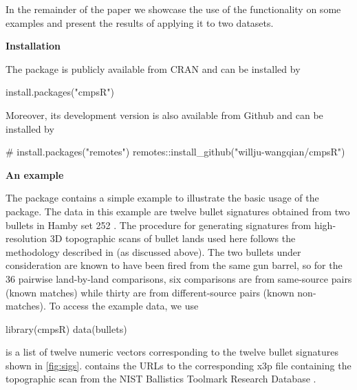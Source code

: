 In the remainder of the paper we showcase the use of the 
functionality on some examples and present the results of applying it to
two datasets.

\textbf{Installation}

The  package is publicly available from CRAN and can be
installed by

\begin{Schunk}
\begin{Sinput}
install.packages("cmpsR")
\end{Sinput}
\end{Schunk}

Moreover, its development version is also available from Github and can
be installed by

\begin{Schunk}
\begin{Sinput}
# install.packages("remotes")
remotes::install_github("willju-wangqian/cmpsR")
\end{Sinput}
\end{Schunk}

\textbf{An example}

The  package contains a simple example to illustrate the
basic usage of the package. The data in this example are twelve bullet
signatures obtained from two bullets in Hamby set 252 \citep{hamby}. The
procedure for generating signatures from high-resolution 3D topographic
scans of bullet lands used here follows the methodology described in
\citet{aoas} (as discussed above). The two bullets under consideration
are known to have been fired from the same gun barrel, so for the 36
pairwise land-by-land comparisons, six comparisons are from same-source
pairs (known matches) while thirty are from different-source pairs
(known non-matches). To access the example data, we use

\begin{Schunk}
\begin{Sinput}
library(cmpsR)
data(bullets)
\end{Sinput}
\end{Schunk}

 is a list of twelve numeric vectors corresponding
to the twelve bullet signatures shown in \autoref{fig:sigs}.
 contains the URLs to the corresponding x3p file
containing the topographic scan from the NIST Ballistics Toolmark
Research Database \citep{nistdb}.

